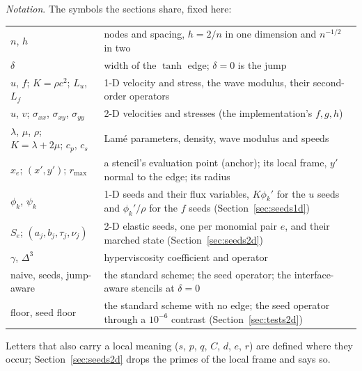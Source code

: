 \documentclass[11pt]{amsart}
\theoremstyle{definition}
\theoremstyle{remark}
\newcommand{\Lu}{L_u}
\newcommand{\Lf}{L_f}
\newcommand{\para}[1]{\par\smallskip\noindent\textit{#1}.\enspace}
\begin{document}
\para{Notation}
The symbols the sections share, fixed here:
\begin{center}
\small
\begin{tabular}{@{}lp{}@{}}
\toprule
$n$, $h$ & nodes and spacing, $h = 2 / n$ in one dimension and $n^{-1/2}$ in two \\
$\delta$ & width of the $\tanh$ edge; $\delta = 0$ is the jump \\
$u$, $f$; $K = \rho c^2$; $\Lu$, $\Lf$ & 1-D velocity and stress, the wave modulus, their second-order operators \\
$u$, $v$; $\sigma_{xx}$, $\sigma_{xy}$, $\sigma_{yy}$ & 2-D velocities and stresses (the implementation's $f, g, h$) \\
$\lambda$, $\mu$, $\rho$; $K = \lambda + 2\mu$; $c_p$, $c_s$ & Lam\'e parameters, density, wave modulus and speeds \\
$x_e$; $(x', y')$; $r_{\max}$ & a stencil's evaluation point (anchor); its local frame, $y'$ normal to the edge; its radius \\
$\phi_k$, $\psi_k$ & 1-D seeds and their flux variables, $K \phi_k'$ for the $u$ seeds and $\phi_k' / \rho$ for the $f$ seeds (Section~\ref{sec:seeds1d}) \\
$S_e$; $(a_j, b_j, \tau_j, \nu_j)$ & 2-D elastic seeds, one per monomial pair $e$, and their marched state (Section~\ref{sec:seeds2d}) \\
$\gamma$, $\Delta^3$ & hyperviscosity coefficient and operator \\
naive, seeds, jump-aware & the standard scheme; the seed operator; the interface-aware stencils at $\delta = 0$ \\
floor, seed floor & the standard scheme with no edge; the seed operator through a $10^{-6}$ contrast (Section~\ref{sec:tests2d}) \\
\bottomrule
\end{tabular}
\end{center}
Letters that also carry a local meaning ($s$, $p$, $q$, $C$, $d$, $e$,
$r$) are defined where they occur; Section~\ref{sec:seeds2d} drops the
primes of the local frame and says so.
\end{document}
